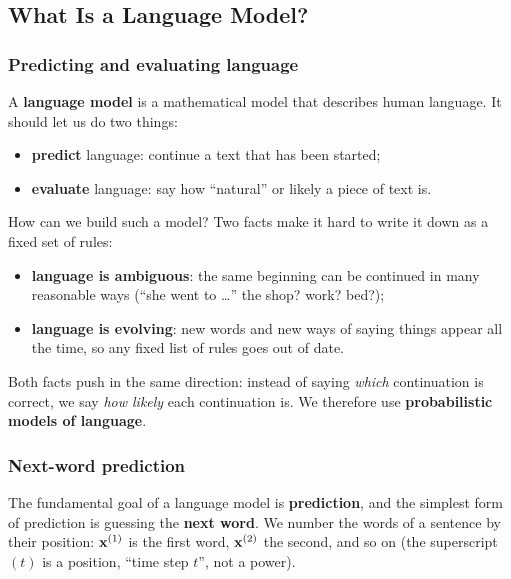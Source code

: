 \subsection{What Is a Language Model?}
\label{sec:what-is-a-language-model}

\subsubsection{Predicting and evaluating language}

A \textbf{language model} is a mathematical model that describes human language. It
should let us do two things:
\begin{itemize}[nosep]
  \item \textbf{predict} language: continue a text that has been started;
  \item \textbf{evaluate} language: say how ``natural'' or likely a piece of text is.
\end{itemize}

How can we build such a model? Two facts make it hard to write it down as a fixed set of
rules:
\begin{itemize}[nosep]
  \item \textbf{language is ambiguous}: the same beginning can be continued in many
        reasonable ways (``she went to \ldots'' the shop? work? bed?);
  \item \textbf{language is evolving}: new words and new ways of saying things appear
        all the time, so any fixed list of rules goes out of date.
\end{itemize}
Both facts push in the same direction: instead of saying \emph{which} continuation is
correct, we say \emph{how likely} each continuation is. We therefore use
\textbf{probabilistic models of language}.

\subsubsection{Next-word prediction}

The fundamental goal of a language model is \textbf{prediction}, and the simplest form
of prediction is guessing the \textbf{next word}. We number the words of a sentence by
their position: $\mathbf{x}^{(1)}$ is the first word, $\mathbf{x}^{(2)}$ the second, and so on
(the superscript $(t)$ is a position, ``time step $t$'', not a power).

